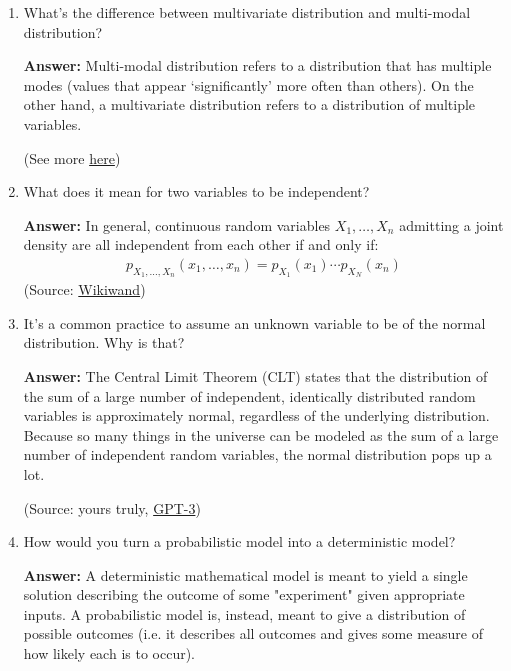 \documentclass{article}
\newenvironment{QandA}{\begin{enumerate}[label=\arabic*.]}{\end{enumerate}}
\newenvironment{answer}{\par\normalfont \textbf{Answer:}}{}
\begin{document}
\begin{QandA}
    \item What’s the difference between multivariate distribution and multi-modal distribution?
    \begin{answer}
        Multi-modal distribution refers to a distribution that has multiple modes (values that appear `significantly' more often than others). On the other hand, a multivariate distribution refers to a distribution of multiple variables.
        
        (See more \href{https://stats.stackexchange.com/questions/168586/what-is-the-difference-between-multimodal-and-multivariate}{here})
    \end{answer}

    \item What does it mean for two variables to be independent?
    \begin{answer}
        In general, continuous random variables $X_1, \ldots, X_n$ admitting a joint density are all independent from each other if and only if:
        \begin{align*}
            p_{X_1, \ldots, X_n} \left(x_1, \ldots, x_n \right) = p_{X_1}(x_1)\cdots p_{X_N}(x_n)
        \end{align*}
        (Source: \href{https://www.wikiwand.com/en/Probability_density_function#/Independence}{Wikiwand})
    \end{answer}

    \item It’s a common practice to assume an unknown variable to be of the normal distribution. Why is that?
    \begin{answer}
        The Central Limit Theorem (CLT) states that the distribution of the sum of a large number of independent, identically distributed random variables is approximately normal, regardless of the underlying distribution. Because so many things in the universe can be modeled as the sum of a large number of independent random variables, the normal distribution pops up a lot. 
        
        (Source: yours truly, \href{https://twitter.com/joaoli13/status/1530959944064851968}{GPT-3})
    \end{answer}

    \item How would you turn a probabilistic model into a deterministic model?
    \begin{answer}
        A deterministic mathematical model is meant to yield a single solution describing the outcome of some "experiment" given appropriate inputs. A probabilistic model is, instead, meant to give a distribution of possible outcomes (i.e. it describes all outcomes and gives some measure of how likely each is to occur).


\end{answer}
\end{QandA}
\end{document}
